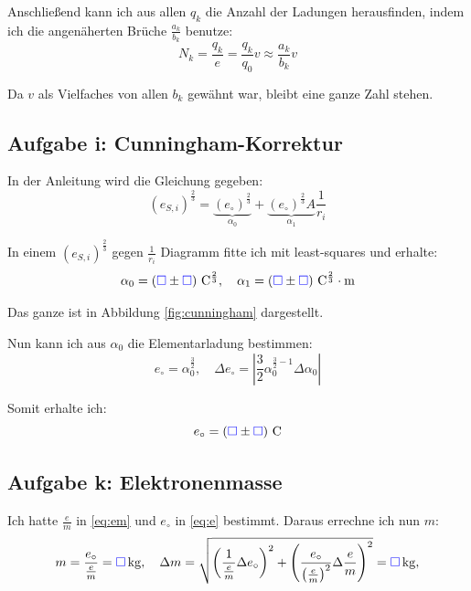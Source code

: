 \documentclass[11pt, ngerman]{article}
\newcommand{\emesswert}{\left(\messwert \pm \messwert \right)}
\newcommand{\messwert}{\textcolor{blue}{\square}}
\begin{document}
Anschließend kann ich aus allen $q_k$ die Anzahl der Ladungen herausfinden,
indem ich die angenäherten Brüche $\frac{a_k}{b_k}$ benutze:
\[
	N_k
	= \frac{q_k}e
	= \frac{q_k}{q_0} v
	\approx \frac{a_k}{b_k} v
\]

Da $v$ als Vielfaches von allen $b_k$ gewähnt war, bleibt eine ganze Zahl
stehen. \cite{com.stackoverflow/divisor, com.stackexchange.math/denominator}

\subsection{Aufgabe i: Cunningham-Korrektur}

In der Anleitung wird die Gleichung gegeben:
\[
	\left( e_{S, i} \right)^{\frac 23}
	= \underbrace{\left( e_\circ \right)^{\frac 23}}_{\alpha_0}
	+ \underbrace{\left( e_\circ \right)^{\frac 23} A}_{\alpha_1} \frac 1{r_i}
\]

In einem $\left( e_{S, i} \right)^{\frac 23}$ gegen $\frac 1{r_i}$ Diagramm
fitte ich mit least-squares und erhalte:
\[
	\alpha_0 = \unit[\emesswert]{C^{\frac 23}}
	, \quad
	\alpha_1 = \unit[\emesswert]{C^{\frac 23} \cdot m}
\]

Das ganze ist in Abbildung \ref{fig:cunningham} dargestellt.

Nun kann ich aus $\alpha_0$ die Elementarladung bestimmen:
\[
	e_\circ = \alpha_0^{\frac 32}
	, \quad
	\Delta e_\circ = \left| \frac 32 \alpha_0^{\frac 32 -1} \Delta \alpha_0 \right|
\]

Somit erhalte ich:
\begin{equation}
	\label{eq:e}
	e_\circ = \unit[\emesswert] C
\end{equation}

\subsection{Aufgabe k: Elektronenmasse}

Ich hatte $\frac em$ in \eqref{eq:em} und $e_\circ$ in \eqref{eq:e} bestimmt.
Daraus errechne ich nun $m$:
\[
	m = \frac{e_\circ}{\frac em} = \unit[\messwert]{kg},
	\quad
	\Delta m = \sqrt{
		\left(\frac{1}{\frac em} \Delta e_\circ \right)^2
		+ \left( \frac{e_\circ}{\left( \frac em \right)^2} \Delta \frac em \right)^2
	}
	= \unit[\messwert]{kg},
\]

\end{document}
